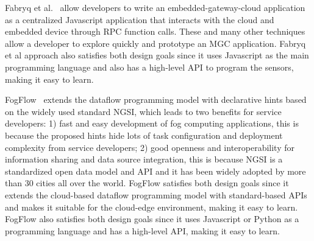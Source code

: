 


Fabryq et al.~\cite{Etemadi2014FabryqUP} allow developers to write an embedded-gateway-cloud application as a centralized Javascript application that interacts with the cloud and embedded device through RPC function calls. These and many other techniques allow a developer to explore quickly and prototype an MGC application. Fabryq et al approach also satisfies both design goals since it uses Javascript as the main programming language and also has a high-level API to program the sensors, making it easy to learn.

FogFlow~\cite{8022859} extends the dataflow programming model with declarative hints based on the widely used standard NGSI, which leads to two benefits for service developers: 1) fast and easy development of fog computing applications, this is because the proposed hints hide lots of task configuration and deployment complexity from service developers; 2) good openness and interoperability for information sharing and data source integration, this is because NGSI is a standardized open data model and API and it has been widely adopted by more than 30 cities all over the world. FogFlow satisfies both design goals since it extends the cloud-based dataflow programming model with standard-based APIs and makes it suitable for the cloud-edge environment, making it easy to learn. FogFlow also satisfies both design goals since it uses Javascript or Python as a programming language and has a high-level API, making it easy to learn.


